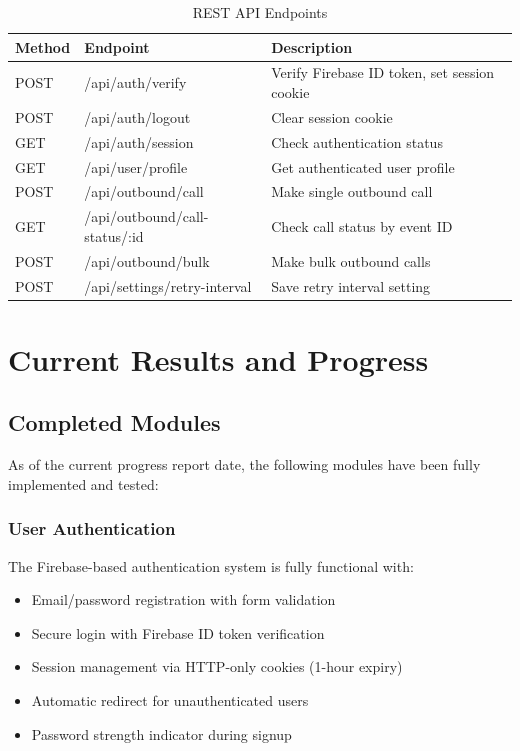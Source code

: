\documentclass[12pt,a4paper,oneside]{book}
\begin{document}
\begin{table}[H]
\centering
\caption{REST API Endpoints}
\label{tab:api}
\begin{tabularx}{\textwidth}{|l|l|X|}
\hline
\textbf{Method} & \textbf{Endpoint} & \textbf{Description} \\
\hline
POST & /api/auth/verify & Verify Firebase ID token, set session cookie \\
\hline
POST & /api/auth/logout & Clear session cookie \\
\hline
GET & /api/auth/session & Check authentication status \\
\hline
GET & /api/user/profile & Get authenticated user profile \\
\hline
POST & /api/outbound/call & Make single outbound call \\
\hline
GET & /api/outbound/call-status/:id & Check call status by event ID \\
\hline
POST & /api/outbound/bulk & Make bulk outbound calls \\
\hline
POST & /api/settings/retry-interval & Save retry interval setting \\
\hline
\end{tabularx}
\end{table}


\chapter{Current Results and Progress}

\section{Completed Modules}

As of the current progress report date, the following modules have been fully implemented and tested:

\subsection{User Authentication}

The Firebase-based authentication system is fully functional with:
\begin{itemize}
    \item Email/password registration with form validation
    \item Secure login with Firebase ID token verification
    \item Session management via HTTP-only cookies (1-hour expiry)
    \item Automatic redirect for unauthenticated users
    \item Password strength indicator during signup
\end{itemize}
\end{document}
